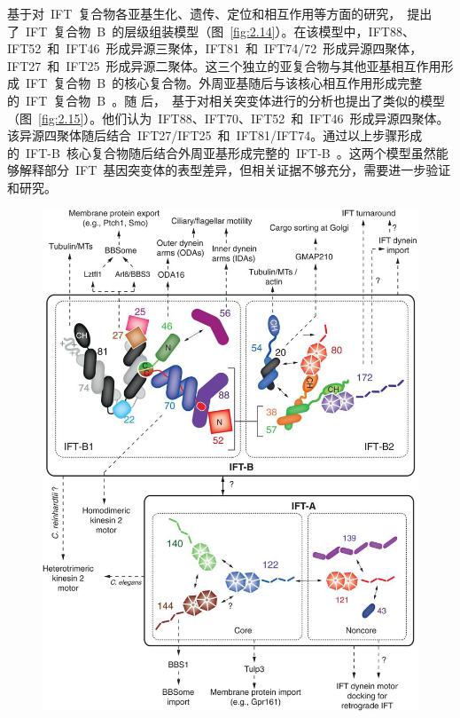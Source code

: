 基于对\ IFT\ 复合物各亚基生化、遗传、定位和相互作用等方面的研究，\citet{Lucker2010}\ 提出了\ IFT\ 复合物\ B\ 的层级组装模型（图\ \ref{fig:2.14}）。在该模型中，IFT88、IFT52\ 和\ IFT46\ 形成异源三聚体，IFT81\ 和\ IFT74/72\ 形成异源四聚体，IFT27\ 和\ IFT25\ 形成异源二聚体。这三个独立的亚复合物与其他亚基相互作用形成\ IFT\ 复合物\ B\ 的核心复合物。外周亚基随后与该核心相互作用形成完整的\ IFT\ 复合物\ B\ \citep{Lucker2010}。随
后，\citet{Richey2012}\ 基于对相关突变体进行的分析也提出了类似的模型（图\ \ref{fig:2.15}）。他们认为\ IFT88、IFT70、IFT52\ 和\ IFT46\ 形成异源四聚体。该异源四聚体随后结合\ IFT27/IFT25\ 和\ IFT81/IFT74。通过以上步骤形成的\ IFT-B\ 核心复合物随后结合外周亚基形成完整的\ IFT-B\ \citep{Richey2012}。这两个模型虽然能够解释部分\ IFT\ 基因突变体的表型差异，但相关证据不够充分，需要进一步验证和研究。
\begin{figure}[htb!]
\centering
\graphicspath{{figures/}}
\includegraphics[width=\textwidth-30mm]{fig2-16.jpg}
{
\par}
\end{figure}


